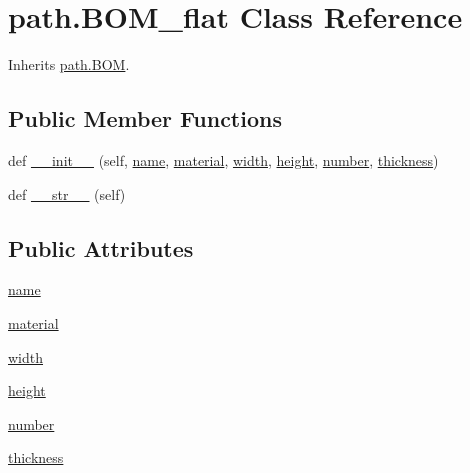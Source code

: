 \hypertarget{classpath_1_1_b_o_m__flat}{}\section{path.\+B\+O\+M\+\_\+flat Class Reference}
\label{classpath_1_1_b_o_m__flat}


Inherits \hyperlink{classpath_1_1_b_o_m}{path.\+B\+O\+M}.

\subsection*{Public Member Functions}
\begin{DoxyCompactItemize}
\item 
def \hyperlink{classpath_1_1_b_o_m__flat_a0aceec1b210a56d9cabc8a7064e26f29}{\+\_\+\+\_\+init\+\_\+\+\_\+} (self, \hyperlink{classpath_1_1_b_o_m__flat_a2f5117498a4d0480504b9ef482266c8d}{name}, \hyperlink{classpath_1_1_b_o_m__flat_a4b14c3049f63f6fa3a3049e0a510093f}{material}, \hyperlink{classpath_1_1_b_o_m__flat_a5a6ced1e7078ceb5952279343b0feb1e}{width}, \hyperlink{classpath_1_1_b_o_m__flat_a969166401f0c01d166e40b1f0e5d9ec4}{height}, \hyperlink{classpath_1_1_b_o_m__flat_a0fc275e35ec2f300e6de6d15afb7b308}{number}, \hyperlink{classpath_1_1_b_o_m__flat_ad81e8b7451c079f0150cfcf6a9a6559a}{thickness})
\item 
def \hyperlink{classpath_1_1_b_o_m__flat_a22dd7a9df382e3c8a808d16aa300a518}{\+\_\+\+\_\+str\+\_\+\+\_\+} (self)
\end{DoxyCompactItemize}
\subsection*{Public Attributes}
\begin{DoxyCompactItemize}
\item 
\hyperlink{classpath_1_1_b_o_m__flat_a2f5117498a4d0480504b9ef482266c8d}{name}
\item 
\hyperlink{classpath_1_1_b_o_m__flat_a4b14c3049f63f6fa3a3049e0a510093f}{material}
\item 
\hyperlink{classpath_1_1_b_o_m__flat_a5a6ced1e7078ceb5952279343b0feb1e}{width}
\item 
\hyperlink{classpath_1_1_b_o_m__flat_a969166401f0c01d166e40b1f0e5d9ec4}{height}
\item 
\hyperlink{classpath_1_1_b_o_m__flat_a0fc275e35ec2f300e6de6d15afb7b308}{number}
\item 
\hyperlink{classpath_1_1_b_o_m__flat_ad81e8b7451c079f0150cfcf6a9a6559a}{thickness}
\end{DoxyCompactItemize}


